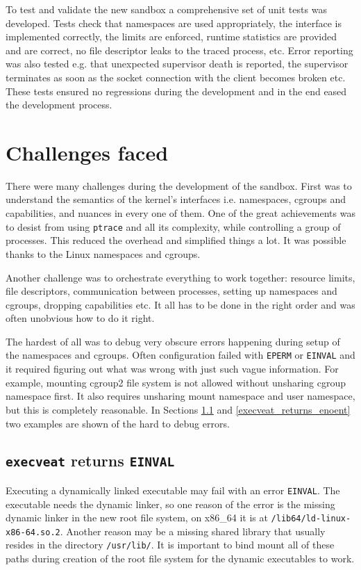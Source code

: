 \documentclass[en]{pracamgr}
\begin{document}
To test and validate the new sandbox a comprehensive set of unit tests was developed. Tests check that namespaces are used appropriately, the interface is implemented correctly, the limits are enforced, runtime statistics are provided and are correct, no file descriptor leaks to the traced process, etc. Error reporting was also tested e.g. that unexpected supervisor death is reported, the supervisor terminates as soon as the socket connection with the client becomes broken etc. These tests ensured no regressions during the development and in the end eased the development process.

\section{Challenges faced}

There were many challenges during the development of the sandbox. First was to understand the semantics of the kernel's interfaces i.e. namespaces, cgroups and capabilities, and nuances in every one of them. One of the great achievements was to desist from using \texttt{ptrace} and all its complexity, while controlling a group of processes. This reduced the overhead and simplified things a lot. It was possible thanks to the Linux namespaces and cgroups.

Another challenge was to orchestrate everything to work together: resource limits, file descriptors, communication between processes, setting up namespaces and cgroups, dropping capabilities etc. It all has to be done in the right order and was often unobvious how to do it right.

The hardest of all was to debug very obscure errors happening during setup of the namespaces and cgroups. Often configuration failed with \texttt{EPERM} or \texttt{EINVAL} and it required figuring out what was wrong with just such vague information. For example, mounting cgroup2 file system is not allowed without unsharing cgroup namespace first. It also requires unsharing mount namespace and user namespace, but this is completely reasonable. In Sections \ref{execveat_returns_einval} and \ref{execveat_returns_enoent} two examples are shown of the hard to debug errors.

\subsection{\texttt{execveat} returns \texttt{EINVAL}} \label{execveat_returns_einval}

Executing a dynamically linked executable may fail with an error \texttt{EINVAL}. The executable needs the dynamic linker, so one reason of the error is the missing dynamic linker in the new root file system, on x86\_64 it is at \texttt{/lib64/ld-linux-x86-64.so.2}. Another reason may be a missing shared library that usually resides in the directory \texttt{/usr/lib/}. It is important to bind mount all of these paths during creation of the root file system for the dynamic executables to work.
\end{document}
